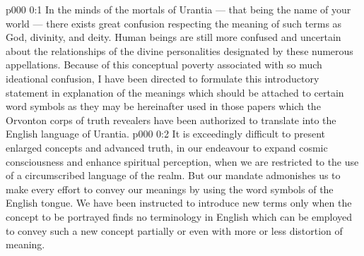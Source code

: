 \author{Divine Counsellor}
\vs p000 0:1 In the minds of the mortals of Urantia --- that being the name of your world --- there exists great confusion respecting the meaning of such terms as God, divinity, and deity. Human beings are still more confused and uncertain about the relationships of the divine personalities designated by these numerous appellations. Because of this conceptual poverty associated with so much ideational confusion, I have been directed to formulate this introductory statement in explanation of the meanings which should be attached to certain word symbols as they may be hereinafter used in those papers which the Orvonton corps of truth revealers have been authorized to translate into the English language of Urantia.
\vs p000 0:2 It is exceedingly difficult to present enlarged concepts and advanced truth, in our endeavour to expand cosmic consciousness and enhance spiritual perception, when we are restricted to the use of a circumscribed language of the realm. But our mandate admonishes us to make every effort to convey our meanings by using the word symbols of the English tongue. We have been instructed to introduce new terms only when the concept to be portrayed finds no terminology in English which can be employed to convey such a new concept partially or even with more or less distortion of meaning.
